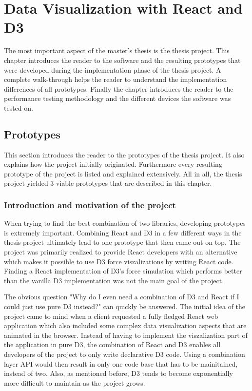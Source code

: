 \chapter{Data Visualization with React and D3}
\label{cha:visualization}

The most important aspect of the master's thesis is the thesis project. This chapter introduces the reader to the software and the resulting prototypes that were developed during the implementation phase of the thesis project. A complete walk-through helps the reader to understand the implementation differences of all prototypes. Finally the chapter introduces the reader to the performance testing methodology and the different devices the software was tested on.

\section{Prototypes}

This section introduces the reader to the prototypes of the thesis project. It also explains how the project initially originated. Furthermore every resulting prototype of the project is listed and explained extensively. All in all, the thesis project yielded 3 viable prototypes that are described in this chapter. 

\subsection{Introduction and motivation of the project}

When trying to find the best combination of two libraries, developing prototypes is extremely important. Combining React and D3 in a few different ways in the thesis project ultimately lead to one prototype that then came out on top. The project was primarily realized to provide React developers with an alternative which makes it possible to use D3 force viszalizations by writing React code. Finding a React implementation of D3's force simulation which performs better than the vanilla D3 implementation was not the main goal of the project.

The obvious question "Why do I even need a combination of D3 and React if I could just use pure D3 instead?" can quickly be answered. The initial idea of the project came to mind when a client requested a fully fledged React web application which also included some complex data visualization aspects that are animated in the browser. Instead of having to implement the viszalization part of the application in pure D3, the combination of React and D3 enables all developers of the project to only write declarative D3 code. Using a combination layer API would then result in only one code base that has to be mainitained, instead of two. Also, as mentioned before, D3 tends to become exponentially more difficult to maintain as the project grows.

